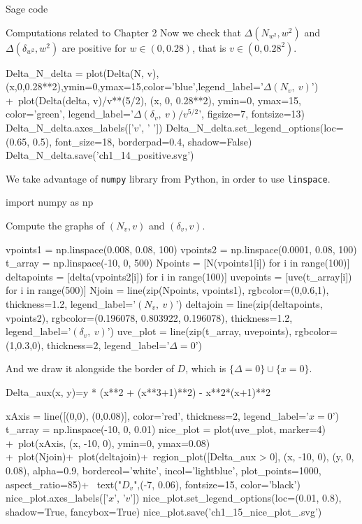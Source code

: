 \documentclass[11pt, a4paper, english, twoside, notitlepage, openright]{report}
\begin{document}
\begin{chapter}{Sage code}
\begin{section}{Computations related to Chapter 2}
Now we check that $\Delta(N_{w^2}, w^2)$ and $\Delta(\delta_{w^2}, w^2)$ are positive for $w\in(0, 0.28)$, that is $v\in (0, 0.28^2)$.
\begin{sage}
Delta_N_delta = plot(Delta(N, v),(x,0,0.28**2),ymin=0,ymax=15,color='blue',legend_label='$\Delta(N_{v},\ v)$') +\
    plot(Delta(delta, v)/v**(5/2), (x, 0, 0.28**2), ymin=0, ymax=15, color='green', legend_label='$\Delta(\delta_{v},\ v)/v^{5/2}$', figsize=7, fontsize=13)
Delta_N_delta.axes_labels(['$v$', ' '])
Delta_N_delta.set_legend_options(loc=(0.65, 0.5), font_size=18, borderpad=0.4, shadow=False)
Delta_N_delta.save('ch1_14_positive.svg')
\end{sage}

We take advantage of {\tt numpy} library from Python, in order to use {\tt linspace}.
\begin{sage}
import numpy as np
\end{sage}

Compute the graphs of $(N_v, v)$ and $(\delta_v, v)$.
\begin{sage}
vpoints1 = np.linspace(0.008, 0.08, 100)
vpoints2 = np.linspace(0.0001, 0.08, 100)
t_array = np.linspace(-10, 0, 500)
Npoints = [N(vpoints1[i]) for i in range(100)]
deltapoints = [delta(vpoints2[i]) for i in range(100)]
uvepoints = [uve(t_array[i]) for i in range(500)]
Njoin = line(zip(Npoints, vpoints1), rgbcolor=(0,0.6,1), thickness=1.2, legend_label='$(N_v,\ v)$')
deltajoin = line(zip(deltapoints, vpoints2), rgbcolor=(0.196078, 0.803922, 0.196078), thickness=1.2, legend_label='$(\delta_v,\ v)$')
uve_plot = line(zip(t_array, uvepoints), rgbcolor=(1,0.3,0), thickness=2, legend_label='$\Delta = 0$')
\end{sage}

And we draw it alongside the border of $D$, which is $\{\Delta = 0\} \cup \{x=0\}$.
\begin{sage}
Delta_aux(x, y)=y * (x**2 + (x**3+1)**2) - x**2*(x+1)**2
\end{sage}

\begin{sage}
xAxis = line([(0,0), (0,0.08)], color='red', thickness=2, legend_label='$x = 0$')
t_array = np.linspace(-10, 0, 0.01)
nice_plot = plot(uve_plot, marker=4) +\
    plot(xAxis, (x, -10, 0), ymin=0, ymax=0.08) +\
    plot(Njoin)+\
    plot(deltajoin)+\
    region_plot([Delta_aux > 0], (x, -10, 0), (y, 0, 0.08), alpha=0.9, bordercol='white', incol='lightblue', plot_points=1000, aspect_ratio=85)+ \
    text("$D_v$",(-7, 0.06), fontsize=15, color='black')
nice_plot.axes_labels(['$x$', '$v$'])
nice_plot.set_legend_options(loc=(0.01, 0.8), shadow=True, fancybox=True)
nice_plot.save('ch1_15_nice_plot_.svg')
\end{sage}


\end{section}
\end{chapter}
\end{document}
